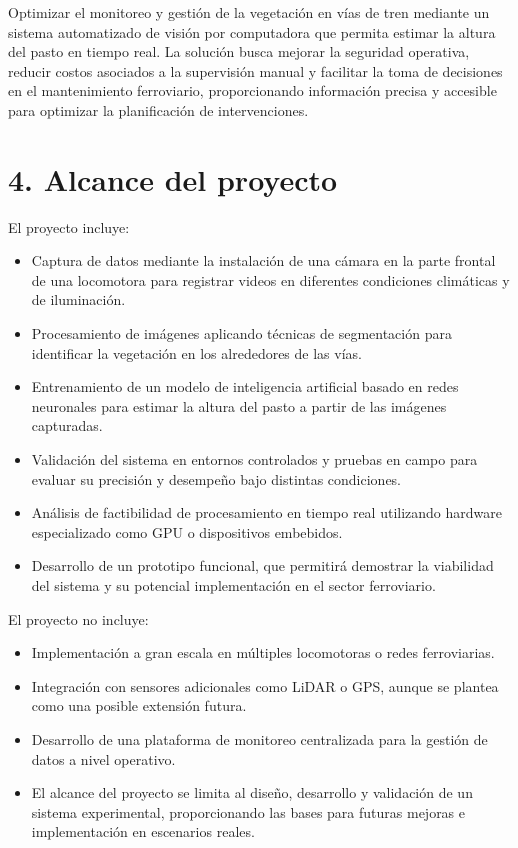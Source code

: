 \documentclass[
11pt, %
]{ProyectoVpC}
\begin{document}
Optimizar el monitoreo y gestión de la vegetación en vías de tren mediante un sistema automatizado de visión por computadora que permita estimar la altura del pasto en tiempo real. La solución busca mejorar la seguridad operativa, reducir costos asociados a la supervisión manual y facilitar la toma de decisiones en el mantenimiento ferroviario, proporcionando información precisa y accesible para optimizar la planificación de intervenciones.

\section{4. Alcance del proyecto}
\label{sec:alcance}

El proyecto incluye:
\begin{itemize}
\item Captura de datos mediante la instalación de una cámara en la parte frontal de una locomotora para registrar videos en diferentes condiciones climáticas y de iluminación.
\item Procesamiento de imágenes aplicando técnicas de segmentación para identificar la vegetación en los alrededores de las vías.
\item Entrenamiento de un modelo de inteligencia artificial basado en redes neuronales para estimar la altura del pasto a partir de las imágenes capturadas.
\item Validación del sistema en entornos controlados y pruebas en campo para evaluar su precisión y desempeño bajo distintas condiciones.
\item Análisis de factibilidad de procesamiento en tiempo real utilizando hardware especializado como GPU o dispositivos embebidos.
\item Desarrollo de un prototipo funcional, que permitirá demostrar la viabilidad del sistema y su potencial implementación en el sector ferroviario.

\end{itemize}
El proyecto no incluye:
\begin{itemize}
\item Implementación a gran escala en múltiples locomotoras o redes ferroviarias.
\item Integración con sensores adicionales como LiDAR o GPS, aunque se plantea como una posible extensión futura.
\item Desarrollo de una plataforma de monitoreo centralizada para la gestión de datos a nivel operativo.
\item El alcance del proyecto se limita al diseño, desarrollo y validación de un sistema experimental, proporcionando las bases para futuras mejoras e implementación en escenarios reales.
\end{itemize}
\end{document}
